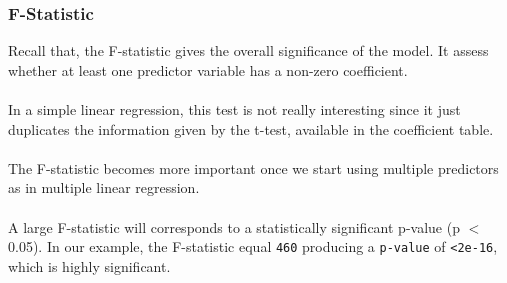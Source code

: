 \documentclass[a4paper]{article}
\begin{document}
\subsubsection{F-Statistic}
Recall that, the F-statistic gives the overall significance of the model. It assess whether at least one predictor variable has a non-zero coefficient.\\\\
In a simple linear regression, this test is not really interesting since it just duplicates the information given by the t-test, available in the coefficient table.\\\\
The F-statistic becomes more important once we start using multiple predictors as in multiple linear regression.\\\\
A large F-statistic will corresponds to a statistically significant p-value (p $<$ 0.05). In our example, the F-statistic equal \verb|460| producing a \verb|p-value| of \verb|<2e-16|, which is highly significant.
\end{document}
